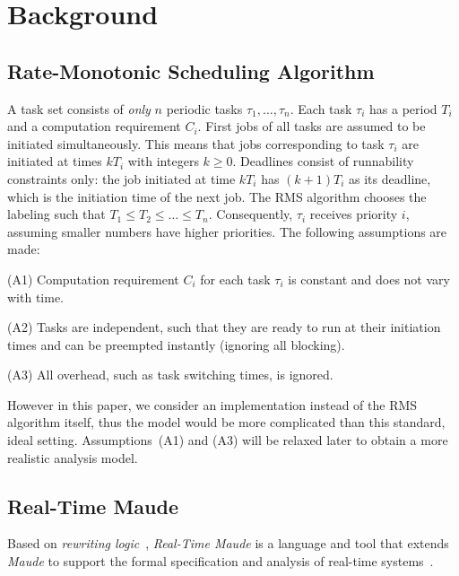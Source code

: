 \documentclass[10pt,journal,compsoc]{IEEEtran}
\begin{document}
\section{Background}
\label{s:background}

\subsection{Rate-Monotonic Scheduling Algorithm}
\label{ss:rms}
A task set consists of \emph{only} $n$ periodic tasks
$\tau_1,\ldots,\tau_n$. Each task $\tau_i$ has a period $T_i$ and a
computation requirement $C_i$. First jobs of all tasks are assumed to
be initiated simultaneously. This means that jobs corresponding to
task $\tau_i$ are initiated at times $kT_i$ with integers $k\ge
0$. Deadlines consist of runnability constraints only: the job
initiated at time $kT_i$ has $(k+1)T_i$ as its deadline, which is the
initiation time of the next job. The RMS algorithm chooses the
labeling such that $T_1\le T_2\le \ldots \le T_n$. Consequently,
$\tau_i$ receives priority $i$, assuming smaller numbers have higher
priorities. The following assumptions are made:

(A1) Computation requirement $C_i$ for each task $\tau_i$ is constant
and does not vary with time.

(A2) Tasks are independent, such that they are ready to run at their
initiation times and can be preempted instantly (ignoring all
blocking).

(A3) All overhead, such as task switching times, is ignored.

However in this paper, we consider an implementation instead of the
RMS algorithm itself, thus the model would be more complicated than
this standard, ideal setting.  Assumptions~(A1) and (A3) will be
relaxed later to obtain a more realistic analysis model.

\subsection{Real-Time Maude}
Based on \emph{rewriting logic}~\cite{DBLP:journals/jlp/Meseguer12},
\emph{Real-Time Maude} is a language and tool that extends
\emph{Maude} to support the formal specification and analysis of
real-time systems~\cite{DBLP:journals/lisp/OlveczkyM07}.
\end{document}
